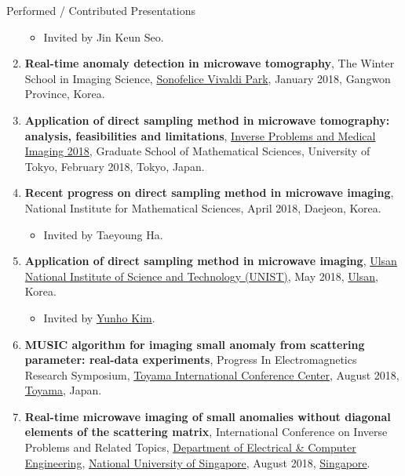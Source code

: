 \documentclass{resume} %
\begin{document}
\begin{rSection}{Performed / Contributed Presentations}
\begin{enumerate}
\begin{itemize}
\item Invited by Jin Keun Seo.
\end{itemize}
\item\label{P-WSIS2018} \textbf{Real-time anomaly detection in microwave tomography}, The  Winter School in Imaging Science, \href{https://www.sonohotelsresorts.com/web/dm_english/html/09sonofelice_english_sub_01_01.html}{Sonofelice Vivaldi Park}, January 2018, Gangwon Province, Korea.
\item\label{P-DSM2018A} \textbf{Application of direct sampling method in microwave tomography: analysis, feasibilities and limitations}, \href{http://faculty.ms.u-tokyo.ac.jp/~a3inverse/InvMed2018/}{Inverse Problems and Medical Imaging 2018}, Graduate School of Mathematical Sciences, University of Tokyo, February 2018, Tokyo, Japan.
\item\label{P-DSM2018B} \textbf{Recent progress on direct sampling method in microwave imaging}, National Institute for Mathematical Sciences, April 2018, Daejeon, Korea.
\begin{itemize}
\item Invited by Taeyoung Ha.
\end{itemize}
\item\label{P-DSM2018C} \textbf{Application of direct sampling method in microwave imaging}, \href{http://www.unist.ac.kr/}{Ulsan National Institute of Science and Technology (UNIST)}, May 2018, \href{http://www.ulsan.go.kr/english/index}{Ulsan}, Korea.
\begin{itemize}
\item Invited by \href{http://yunhokim.wordpress.com/}{Yunho Kim}.
\end{itemize}
\item\label{P-PIERS2018} \textbf{MUSIC algorithm for imaging small anomaly from scattering parameter: real-data experiments}, Progress In Electromagnetics Research Symposium, \href{http://www.ticc.co.jp/english/}{Toyama International Conference Center}, August 2018, \href{http://www.city.toyama.toyama.jp/english/English.html}{Toyama}, Japan.
\item\label{P-ICIP2018} \textbf{Real-time microwave imaging of small anomalies without diagonal elements of the scattering matrix}, International Conference on Inverse Problems and Related Topics, \href{https://www.ece.nus.edu.sg/}{Department of Electrical \& Computer Engineering}, \href{http://www.nus.edu.sg}{National University of Singapore}, August 2018, \href{https://www.gov.sg/}{Singapore}.

\end{enumerate}
\end{rSection}
\end{document}
